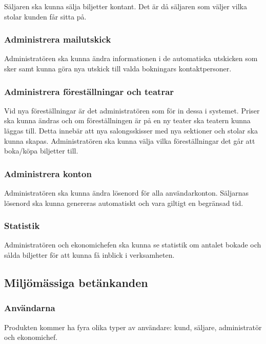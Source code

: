 \documentclass[a4paper, twoside, 11pt, titlepage]{article}
\begin{document}
		Säljaren ska kunna sälja biljetter kontant. Det är då säljaren som väljer vilka stolar kunden får sitta på.

		\subsubsection{Administrera mailutskick}


		Administratören ska kunna ändra informationen i de automatiska utskicken som sker samt kunna göra nya utskick till valda bokningars kontaktpersoner.

		\subsubsection{Administrera föreställningar och teatrar}


		Vid nya föreställningar är det administratören som  för in dessa i systemet. Priser ska kunna ändras och om föreställningen är på en ny teater ska teatern kunna läggas till. Detta innebär att nya salongsskisser med nya sektioner och stolar ska kunna skapas. Administratören ska kunna välja vilka föreställningar det går att boka/köpa biljetter till.

		\subsubsection{Administrera konton}


		Administratören ska kunna ändra lösenord för alla användarkonton. Säljarnas lösenord ska kunna genereras automatiskt och vara giltigt en begränsad tid.

		\subsubsection{Statistik}


		Administratören och ekonomichefen ska kunna se statistik om antalet bokade och sålda biljetter för att kunna få inblick i verksamheten.

	\subsection{Miljömässiga betänkanden}



		\subsubsection{Användarna}


		Produkten kommer ha fyra olika typer av användare: kund, säljare, administratör och ekonomichef.
\end{document}
